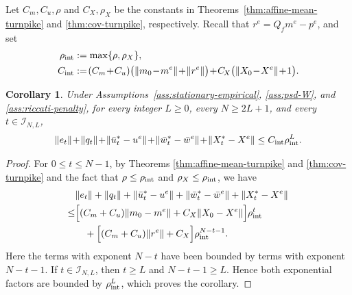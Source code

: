 \documentclass[10pt,journal,twoside]{IEEEtran}
\newtheorem{corollary}{Corollary}
\theoremstyle{definition}
\theoremstyle{remark}
\begin{document}
Let \(C_m,C_u,\rho\) and \(C_X,\rho_X\) be the constants in
Theorems~\ref{thm:affine-mean-turnpike} and
\ref{thm:cov-turnpike}, respectively. Recall that
\(r^e=Q_fm^e-p^e\), and set
\begin{equation*}
	\begin{aligned}
		\rho_{\rm int}
		&:=
		\max\{\rho,\rho_X\},\\
		C_{\rm int}
		&:=\!
		(C_m\!+\!C_u)
		\bigl(
		\|m_0\!-\!m^e\|\!+\!\|r^e\|
		\bigr)\!+\!
		C\!_X
		\bigl(
		\|X_0\!-\!X^e\|\!+\!1
		\bigr).
	\end{aligned}
\end{equation*}

\begin{corollary}
	\label{cor:interior-static-approximation}
	Under Assumptions~\ref{ass:stationary-empirical}, \ref{ass:psd-W}, and \ref{ass:riccati-penalty},  for every integer \(L\ge0\), every
	\(N\ge2L+1\), and every \(t\in\mathcal I_{N,L}\),
	\begin{equation*}
			\|e_t\|
			\!+\!\|q_t\|\!+\!
			\|\bar{u}_t^*-u^e\|
			\!+\!\|\bar{w}_t^*-\bar w^e\|\!+\!
			\|X_t^*-X^e\|
			\le
			C_{\rm int}\rho_{\rm int}^{L}.
	\end{equation*}
\end{corollary}

\begin{proof}
	For \(0\le t\le N-1\), by Theorems
	\ref{thm:affine-mean-turnpike} and
	\ref{thm:cov-turnpike} and the fact that
	\(\rho\le\rho_{\rm int}\) and
	\(\rho_X\le\rho_{\rm int}\), we have
	\[
	\begin{aligned}
		&\|e_t\|
			+\|q_t\|+
			\|\bar{u}_t^*-u^e\|
			+\|\bar{w}_t^*-\bar w^e\|+
			\|X_t^*-X^e\|\\
		\le&
		\Big[
		(C_m+C_u)\|m_0-m^e\|
		+C_X\|X_0-X^e\|
		\Big]
		\rho_{\rm int}^{t}\\
		&\quad+
		\Big[
		(C_m+C_u)\|r^e\|
		+C_X
		\Big]
		\rho_{\rm int}^{N-t-1}.
	\end{aligned}
	\]
	Here the terms with exponent \(N-t\) have been bounded by terms with exponent
	\(N-t-1\). If \(t\in\mathcal I_{N,L}\), then
	\(t\ge L\) and \(N-t-1\ge L\). Hence both exponential factors are bounded by
	\(\rho_{\rm int}^{L}\), which proves
	the corollary.
\end{proof}
\end{document}
